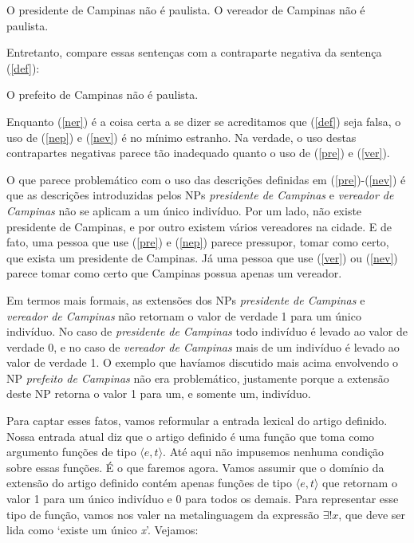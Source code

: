 \begin{exe}
\ex O presidente de Campinas não é paulista.\label{nep}
\ex O vereador de Campinas não é paulista.\label{nev}
\end{exe}

Entretanto, compare essas sentenças com a contraparte negativa da
sentença (\ref{def}):

\begin{exe}
\ex O prefeito de Campinas não é paulista.\label{ner}
\end{exe}

Enquanto (\ref{ner}) é a coisa certa a se dizer se acreditamos que
(\ref{def}) seja falsa, o uso de (\ref{nep}) e (\ref{nev}) é no
mínimo estranho. Na verdade, o uso destas contrapartes negativas
parece tão inadequado quanto o uso de (\ref{pre}) e (\ref{ver}).


O que parece problemático com o uso das descrições definidas em
(\ref{pre})-(\ref{nev}) é que as descrições introduzidas pelos NPs
\textit{presidente de Campinas} e \textit{vereador de Campinas} não se aplicam a
um único indivíduo. Por um lado, não existe presidente de
Campinas, e por outro existem vários vereadores na cidade. E de
fato, uma pessoa que use (\ref{pre}) e (\ref{nep}) parece
pressupor, tomar como certo, que exista um presidente de Campinas.
Já uma pessoa que use (\ref{ver}) ou (\ref{nev}) parece tomar como
certo que Campinas possua apenas um vereador.

Em termos mais formais, as extensões dos NPs \textit{presidente de
Campinas} e \textit{vereador de Campinas} não retornam o valor de verdade
1 para um único indivíduo. No caso de \textit{presidente de Campinas}
todo indivíduo é levado ao valor de verdade 0, e no caso de
\textit{vereador de Campinas} mais de um indivíduo é levado ao valor de
verdade 1. O exemplo que havíamos discutido mais acima envolvendo
o NP \textit{prefeito de Campinas} não era problemático, justamente
porque a extensão deste NP retorna o valor 1 para um, e somente
um, indivíduo.

Para captar esses fatos, vamos reformular a entrada lexical do
artigo definido. Nossa entrada atual diz que o artigo definido é
uma função que toma como argumento funções de tipo $\langle
e,t\rangle$. Até aqui não impusemos nenhuma condição sobre essas
funções. É o que faremos agora. Vamos assumir que o domínio da
extensão do artigo definido contém apenas funções de tipo $\langle
e,t\rangle$ que retornam o valor 1 para um único indivíduo e 0
para todos os demais. Para representar esse tipo de função, vamos nos valer na metalinguagem da expressão $\exists !x$, que deve ser lida como `existe um único \textit{x}'. Vejamos:

